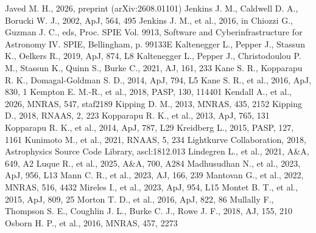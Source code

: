 \documentclass[fleqn,usenatbib]{mnras}
\begin{document}
\begin{thebibliography}{}
 Javed M. H., 2026, preprint (arXiv:2608.01101)
 Jenkins J. M., Caldwell D. A., Borucki W. J., 2002, ApJ, 564, 495
 Jenkins J. M., et al., 2016, in Chiozzi G., Guzman J. C., eds, Proc. SPIE Vol. 9913, Software and Cyberinfrastructure for Astronomy IV. SPIE, Bellingham, p. 99133E
 Kaltenegger L., Pepper J., Stassun K., Oelkers R., 2019, ApJ, 874, L8
 Kaltenegger L., Pepper J., Christodoulou P. M., Stassun K., Quinn S., Burke C., 2021, AJ, 161, 233
 Kane S. R., Kopparapu R. K., Domagal-Goldman S. D., 2014, ApJ, 794, L5
 Kane S. R., et al., 2016, ApJ, 830, 1
 Kempton E. M.-R., et al., 2018, PASP, 130, 114401
 Kendall A., et al., 2026, MNRAS, 547, staf2189
 Kipping D. M., 2013, MNRAS, 435, 2152
 Kipping D., 2018, RNAAS, 2, 223
 Kopparapu R. K., et al., 2013, ApJ, 765, 131
 Kopparapu R. K., et al., 2014, ApJ, 787, L29
 Kreidberg L., 2015, PASP, 127, 1161
 Kunimoto M., et al., 2021, RNAAS, 5, 234
 Lightkurve Collaboration, 2018, Astrophysics Source Code Library, ascl:1812.013
 Lindegren L., et al., 2021, A\&A, 649, A2
 Luque R., et al., 2025, A\&A, 700, A284
 Madhusudhan N., et al., 2023, ApJ, 956, L13
 Mann C. R., et al., 2023, AJ, 166, 239
 Mantovan G., et al., 2022, MNRAS, 516, 4432
 Mireles I., et al., 2023, ApJ, 954, L15
 Montet B. T., et al., 2015, ApJ, 809, 25
 Morton T. D., et al., 2016, ApJ, 822, 86
 Mullally F., Thompson S. E., Coughlin J. L., Burke C. J., Rowe J. F., 2018, AJ, 155, 210
 Osborn H. P., et al., 2016, MNRAS, 457, 2273

\end{thebibliography}
\end{document}
